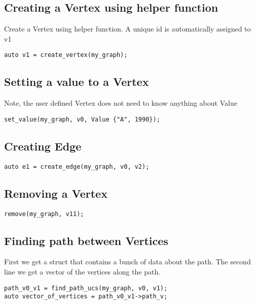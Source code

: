 \documentclass{article}
\begin{document}
\subsection{Creating a Vertex using helper function}
Create a Vertex using helper function. A unique id is automatically assigned to v1
\begin{lstlisting}
auto v1 = create_vertex(my_graph);
\end{lstlisting}

\subsection{Setting a value to a Vertex}
Note, the user defined Vertex does not need to know anything about Value
\begin{lstlisting}
set_value(my_graph, v0, Value {"A", 1990});
\end{lstlisting}


\subsection{Creating Edge}
\begin{lstlisting}
auto e1 = create_edge(my_graph, v0, v2);
\end{lstlisting}

\subsection{Removing a Vertex}
\begin{lstlisting}
remove(my_graph, v11);
\end{lstlisting}

\subsection{Finding path between Vertices}
First we get a struct that contains a bunch of data about the path. The second line we get a vector of the vertices along the path.
\begin{lstlisting}
path_v0_v1 = find_path_ucs(my_graph, v0, v1);
auto vector_of_vertices = path_v0_v1->path_v;
\end{lstlisting}
\end{document}
